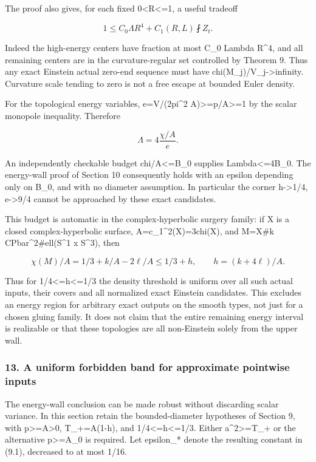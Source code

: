 \documentclass[
  10pt,
]{article}
\begin{document}
The proof also gives, for each fixed 0\textless R\textless=1, a useful
tradeoff

\[
           1\le C_0\Lambda R^4+C_1(R,L)\fint Z_t.      \tag{12.6}
\]

Indeed the high-energy centers have fraction at most C\_0 Lambda R\^{}4,
and all remaining centers are in the curvature-regular set controlled by
Theorem 9. Thus any exact Einstein actual zero-end sequence must have
chi(M\_j)/V\_j-\textgreater infinity. Curvature scale tending to zero is
not a free escape at bounded Euler density.

For the topological energy variables, e=V/(2pi\^{}2
A)\textgreater=p/A\textgreater=1 by the scalar monopole inequality.
Therefore

\[
                   \Lambda=4\frac{\chi/A}{e}.
\]

An independently checkable budget chi/A\textless=B\_0 supplies
Lambda\textless=4B\_0. The energy-wall proof of Section 10 consequently
holds with an epsilon depending only on B\_0, and with no diameter
assumption. In particular the corner h-\textgreater1/4,
e-\textgreater9/4 cannot be approached by these exact candidates.

This budget is automatic in the complex-hyperbolic surgery family: if X
is a closed complex-hyperbolic surface, A=c\_1\^{}2(X)=3chi(X), and
M=X\#k CPbar\^{}2\#ell(S\^{}1 x S\^{}3), then

\[
 \chi(M)/A=1/3+k/A-2\ell/A\le1/3+h,
                    \qquad h=(k+4\ell)/A.             \tag{12.7}
\]

Thus for 1/4\textless=h\textless=1/3 the density threshold is uniform
over all such actual inputs, their covers and all normalized exact
Einstein candidates. This excludes an energy region for arbitrary exact
outputs on the smooth types, not just for a chosen gluing family. It
does not claim that the entire remaining energy interval is realizable
or that these topologies are all non-Einstein solely from the upper
wall.

\hypertarget{a-uniform-forbidden-band-for-approximate-pointwise-inputs}{%
\subsubsection{13. A uniform forbidden band for approximate pointwise
inputs}\label{a-uniform-forbidden-band-for-approximate-pointwise-inputs}}

The energy-wall conclusion can be made robust without discarding scalar
variance. In this section retain the bounded-diameter hypotheses of
Section 9, with p\textgreater=A\textgreater0, T\_+=A(1-h), and
1/4\textless=h\textless=1/3. Either a\^{}2\textgreater=T\_+ or the
alternative p\textgreater=A\_0 is required. Let epsilon\_* denote the
resulting constant in (9.1), decreased to at most 1/16.
\end{document}
